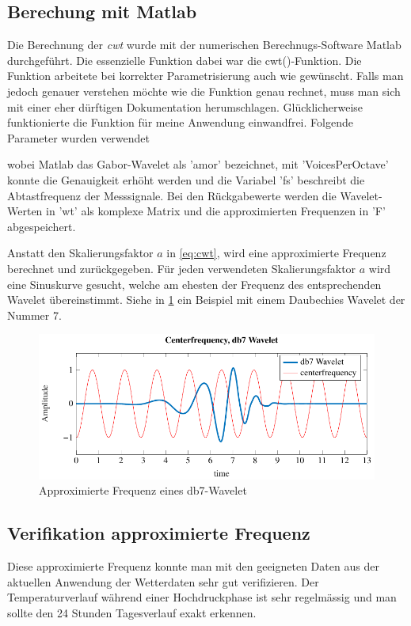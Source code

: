 \begin{refsection}
\newpage
\subsection{Berechung mit Matlab}
Die Berechnung der \textit{cwt} wurde mit der numerischen Berechnugs-Software Matlab durchgeführt.
Die essenzielle Funktion dabei war die cwt()-Funktion. Die Funktion arbeitete bei korrekter Parametrisierung auch wie gewünscht. Falls man jedoch genauer verstehen möchte wie die Funktion genau rechnet, muss man sich mit einer eher dürftigen Dokumentation herumschlagen. Glücklicherweise funktionierte die Funktion für meine Anwendung einwandfrei. Folgende Parameter wurden verwendet

\label{fig:matlab_code_cwt}
wobei Matlab das Gabor-Wavelet als 'amor' bezeichnet, mit 'VoicesPerOctave' konnte die Genauigkeit erhöht werden und die Variabel 'fs' beschreibt die Abtastfrequenz der Messsignale.
Bei den Rückgabewerte werden die Wavelet-Werten in 'wt' als komplexe Matrix und die approximierten Frequenzen in 'F' abgespeichert.

Anstatt den Skalierungsfaktor $a$ in \ref{eq:cwt}, wird eine approximierte Frequenz berechnet und zurückgegeben.
Für jeden verwendeten Skalierungsfaktor $a$ wird eine Sinuskurve gesucht, welche am ehesten der Frequenz des entsprechenden Wavelet übereinstimmt. Siehe in \ref{fig:centerf} ein Beispiel mit einem Daubechies Wavelet der Nummer 7.
\begin{figure}[h]
	\centering
	\includegraphics[width=1\textwidth]{papers/wwt/images/centerf.pdf}
	\caption{Approximierte Frequenz eines db7-Wavelet}
	\label{fig:centerf}
\end{figure}


\newpage
\subsection{Verifikation approximierte Frequenz}
Diese approximierte Frequenz konnte man mit den geeigneten Daten aus der aktuellen Anwendung der Wetterdaten sehr gut verifizieren.
Der Temperaturverlauf während einer Hochdruckphase ist sehr regelmässig und man sollte den 24 Stunden Tagesverlauf exakt erkennen.


\end{refsection}
